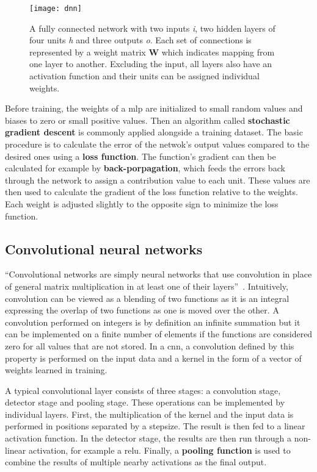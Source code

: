 \begin{figure}[H]
\centering
\texttt{[image: dnn]}
\caption{A fully connected network with two inputs \textit{i}, two hidden layers of
         four units \textit{h} and three outputs \textit{o}. Each set of connections
         is represented by a weight matrix \textbf{W} which indicates mapping from one
         layer to another. Excluding the input, all layers also have an activation
         function and their units can be assigned individual weights.}\label{fig:fcon}
\end{figure}

Before training, the weights of a \ac{mlp} are initialized to small random values and 
biases to zero or small positive values. Then an algorithm called \textbf{stochastic
gradient descent} is commonly applied alongside a training dataset. The basic procedure
is to calculate the error of the netwok's output values compared to the desired ones 
using a \textbf{loss function}. The function's gradient can then be calculated for
example by \textbf{back-porpagation}, which feeds the errors back through the network
to assign a contribution value to each unit. These values are then used to calculate
the gradient of the loss function relative to the weights. Each weight is adjusted
slightly to the opposite sign to minimize the loss function.

\subsection{Convolutional neural networks}\label{ssec:dlcnn}

``Convolutional networks are simply neural networks that use convolution in place of
general matrix multiplication in at least one of their layers''~\cite{DEEP_LEARNING}.
Intuitively, convolution can be viewed as a blending of two functions as it is an
integral expressing the overlap of two functions as one is moved over the other.
A convolution performed on integers is by definition an infinite summation but it
can be implemented on a finite number of elements if the functions are considered
zero for all values that are not stored. In a \ac{cnn}, a convolution defined by this
property is performed on the input data and a kernel in the form of a vector of weights
learned in training.

A typical convolutional layer consists of three stages: a convolution stage, detector
stage and pooling stage. These operations can be implemented by individual layers. First,
the multiplication of the kernel and the input data is performed in positions separated by
a stepsize. The result is then fed to a linear activation function. In the detector stage,
the results are then run through a non-linear activation, for example a \ac{relu}. Finally,
a \textbf{pooling function} is used to combine the results of multiple nearby activations
as the final output.

